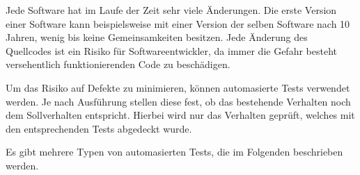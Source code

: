 Jede Software hat im Laufe der Zeit sehr viele Änderungen. 
Die erste Version einer Software kann beispielsweise mit einer Version der selben Software nach 10 Jahren, wenig bis keine Gemeinsamkeiten besitzen.
Jede Änderung des Quellcodes ist ein Risiko für Softwareentwickler, da immer die Gefahr besteht versehentlich funktionierenden Code zu beschädigen.

Um das Risiko auf Defekte zu minimieren, können automasierte Tests verwendet werden. Je nach Ausführung stellen diese fest,
ob das bestehende Verhalten noch dem Sollverhalten entspricht. Hierbei wird nur das Verhalten geprüft, 
welches mit den entsprechenden Tests abgedeckt wurde.

Es gibt mehrere Typen von automasierten Tests, die im Folgenden beschrieben werden.

